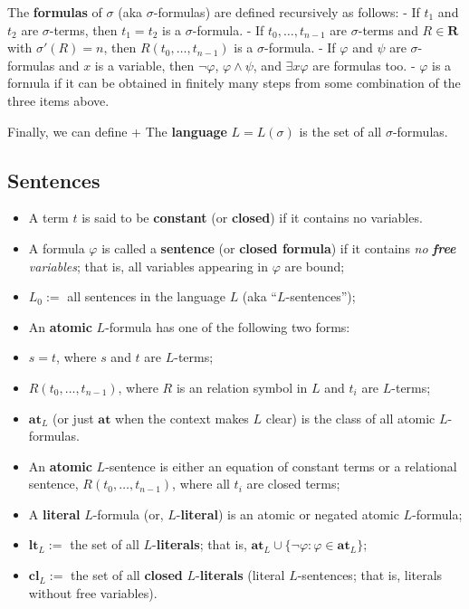 \documentclass[a4paper,UKenglish,cleveref,autoref,thm-restate,12pt]{lipics-v2021-wjd}
\newcommand{\<}{\langle}
\renewcommand{\>}{\rangle}
\begin{document}
The \textbf{formulas} of \(\sigma\) (aka \(\sigma\)-formulas) are
defined recursively as follows: - If \(t_1\) and \(t_2\) are
\(\sigma\)-terms, then \(t_1 = t_2\) is a \(\sigma\)-formula. - If
\(t_0,\dots, t_{n-1}\) are \(\sigma\)-terms and \(R \in \mathbf R\) with
\(\sigma'(R)=n\), then \(R(t_0,\dots, t_{n-1})\) is a
\(\sigma\)-formula. - If \(\varphi\) and \(\psi\) are
\(\sigma\)-formulas and \(x\) is a variable, then \(\neg \varphi\),
\(\varphi \wedge \psi\), and \(\exists x \varphi\) are formulas too. -
\(\varphi\) is a fornıula if it can be obtained in finitely many steps
from some combination of the three items above.

Finally, we can define + The \textbf{language} \(L = L(\sigma)\) is the
set of all \(\sigma\)-formulas.


\subsection{Sentences}\label{sentences}

\begin{itemize}
\item
  A term \(t\) is said to be \textbf{constant} (or \textbf{closed}) if
  it contains no variables.
\item
  A formula \(\varphi\) is called a \textbf{sentence} (or \textbf{closed
  formula}) if it contains \emph{no \textbf{free} variables}; that is,
  all variables appearing in \(\varphi\) are bound;
\item
  \(L_0 :=\) all sentences in the language \(L\) (aka
  ``\(L\)-sentences'');
\item
  An \textbf{atomic} \(L\)-formula has one of the following two forms:
\item
  \(s = t\), where \(s\) and \(t\) are \(L\)-terms;
\item
  \(R(t_0, \dots, t_{n-1})\), where \(R\) is an relation symbol in \(L\)
  and \(t_i\) are \(L\)-terms;
\item
  \(\mathbf{at}_L\) (or just \(\mathbf{at}\) when the context makes
  \(L\) clear) is the class of all atomic \(L\)-formulas.
\item
  An \textbf{atomic} \(L\)-sentence is either an equation of constant
  terms or a relational sentence, \(R(t_0, \dots, t_{n-1})\), where all
  \(t_i\) are closed terms;
\item
  A \textbf{literal} \(L\)-formula (or, \(L\)-\textbf{literal}) is an
  atomic or negated atomic \(L\)-formula;
\item
  \(\mathbf{lt}_L:=\) the set of all \(L\)-\textbf{literals}; that is,
  \(\mathbf{at}_L \cup \{\neg \varphi : \varphi \in \mathbf{at}_L\}\);
\item
  \(\mathbf{cl}_L:=\) the set of all \textbf{closed}
  \(L\)-\textbf{literals} (literal \(L\)-sentences; that is, literals
  without free variables).
\end{itemize}
\end{document}
